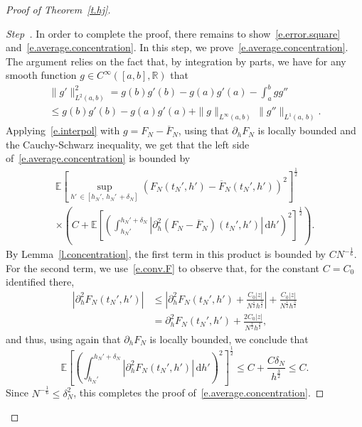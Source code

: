 \documentclass[10pt]{amsart}
\theoremstyle{definition}\newtheorem{defi}[theo]{Definition}\newtheorem{rema}[theo]{Remark}\newtheorem{exam}[theo]{Example}\newtheorem{exem}[theo]{Example}\newtheorem{nota}[theo]{Notation}
\newcommand{\R}{\mathbb{R}}
\newcommand{\E}{\mathbb{E}}
\renewcommand{\d}{\mathrm{d}}
\newcommand{\1}{\mathds{1}}
\renewcommand{\le}{\leqslant}
\renewcommand{\bar}{\overline}
\newcommand{\de}{\delta}
\newcounter{stepcount}
\newenvironment{step}{\refstepcounter{stepcount}\begin{proof}[Step~\thestepcount]}{\let\qed\relax\end{proof}}
\begin{document}
\begin{proof}[Proof of Theorem~\ref{t.hj}]
\begin{step}\label{prooftheo2.1step5}
In order to complete the proof, there remains to show~\eqref{e.error.square} and~\eqref{e.average.concentration}. In this step, we prove~\eqref{e.average.concentration}. The argument relies on the fact that, by integration by parts, we have for any smooth function $g \in C^\infty([a,b],\R)$ that
\begin{multline}\label{e.interpol}
\|g'\|_{L^2(a,b)}^2  = g(b)g'(b) - g(a) g'(a) - \int_a^b g g''
\\
\le g(b)g'(b) - g(a) g'(a) + \|g\|_{L^\infty(a,b)} \, \|g''\|_{L^1(a,\,b)}.
\end{multline}
Applying~\eqref{e.interpol} with $g = F_N - \bar F_N$, using that $\partial_h F_N$ is locally bounded and the Cauchy-Schwarz inequality, we get that the left side of~\eqref{e.average.concentration} is bounded by
\begin{multline*}
\E \left[\sup_{h'\,\in \left[h_N',\,h_N'\,+ \de_N\right]} \left(F_N\left(t_N',h'\right) - \bar F_N\left(t_N',h'\right)\right)^2 \right] ^\frac 1 2
\\
\times \left(C + \E \left[\left(\int_{h_N'}^{h_N' + \de_N} \left|\partial_h^2 \left(F_N - \bar F_N\right)\left(t_N',h'\right) \right|\, \d h' \right)^2 \right]^\frac 1 2\right).
\end{multline*}
By Lemma~\ref{l.concentration}, the first term in this product is bounded by $C N^{-\frac 1 6}$. For the second term, we use~\eqref{e.conv.F} to observe that, for the constant $C = C_0$ identified there,
\begin{align*}
\left|\partial_h^2 F_N\left(t_N',h'\right) \right| & \le \left|\partial_h^2 F_N\left(t_N',h'\right) + \frac{C_0|z|}{N^\frac 1 2 h^\frac 3 2}\right| + \frac{C_0|z|}{N^\frac 1 2 h^\frac 3 2}
\\
& = \partial_h^2 F_N\left(t_N',h'\right) + \frac{2C_0|z|}{N^\frac 1 2 h^\frac 3 2},
\end{align*}
and thus, using again that $\partial_h F_N$ is locally bounded, we conclude that
\[
\E \left[\left(\int_{h_N'}^{h_N' + \de_N} \left|\partial_h^2 F_N(t_N',h') \right|\, \d h' \right)^2 \right]^\frac 1 2 \le C + \frac{C\de_N}{ h^\frac 3 2} \le C.
\]Since $N^{-\frac 1 6} \le \de_N^2$, this completes the proof of~\eqref{e.average.concentration}.
\end{step}




\end{proof}
\end{document}
